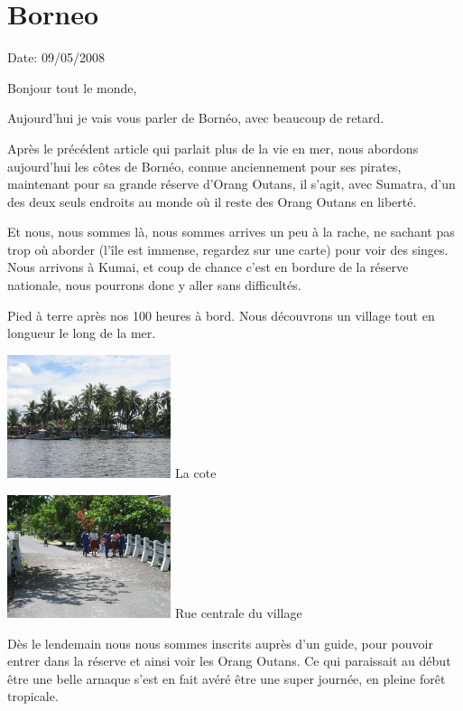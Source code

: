 \section{Borneo}

Date: 09/05/2008

\begin{multicols}{2}

Bonjour tout le monde,

Aujourd'hui je vais vous parler de Bornéo, avec beaucoup de retard.

Après le précédent article qui parlait plus de la vie en mer, nous abordons aujourd'hui les côtes de Bornéo, connue anciennement pour ses pirates, maintenant pour sa grande réserve d'Orang Outans, il s'agit, avec Sumatra, d'un des deux seuls endroits au monde où il reste des Orang Outans en liberté.

Et nous, nous sommes là, nous sommes arrives un peu à la rache, ne sachant pas trop où aborder (l'île est immense, regardez sur une carte) pour voir des singes. Nous arrivons à Kumai, et coup de chance c'est en bordure de la réserve nationale, nous pourrons donc y aller sans difficultés.

Pied à terre après nos 100 heures à bord. Nous découvrons un village tout en longueur le long de la mer.

\hspace*{-0.65cm}
\includegraphics[width=4.8cm]{articles/Borneo/1210331303F4qq.jpg}
La cote

\hspace*{-0.65cm}
\includegraphics[width=4.8cm]{articles/Borneo/1210331297ISJ9.jpg}
Rue centrale du village

Dès le lendemain nous nous sommes inscrits auprès d'un guide, pour pouvoir entrer dans la réserve et ainsi voir les Orang Outans. Ce qui paraissait au début être une belle arnaque s'est en fait avéré être une super journée, en pleine forêt tropicale.


\end{multicols}
